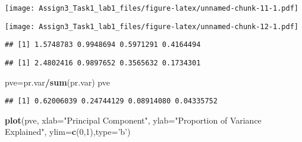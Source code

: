 \documentclass[]{article}
\newenvironment{Shaded}{\begin{snugshade}}{\end{snugshade}}
\newcommand{\DataTypeTok}[1]{\textcolor[rgb]{0.13,0.29,0.53}{#1}}
\newcommand{\DecValTok}[1]{\textcolor[rgb]{0.00,0.00,0.81}{#1}}
\newcommand{\KeywordTok}[1]{\textcolor[rgb]{0.13,0.29,0.53}{\textbf{#1}}}
\newcommand{\NormalTok}[1]{#1}
\newcommand{\OperatorTok}[1]{\textcolor[rgb]{0.81,0.36,0.00}{\textbf{#1}}}
\newcommand{\StringTok}[1]{\textcolor[rgb]{0.31,0.60,0.02}{#1}}
\begin{document}
\texttt{[image: Assign3\_Task1\_lab1\_files/figure-latex/unnamed-chunk-11-1.pdf]}

\begin{Shaded}
\end{Shaded}

\texttt{[image: Assign3\_Task1\_lab1\_files/figure-latex/unnamed-chunk-12-1.pdf]}

\begin{Shaded}
\end{Shaded}

\begin{verbatim}
## [1] 1.5748783 0.9948694 0.5971291 0.4164494
\end{verbatim}

\begin{Shaded}
\end{Shaded}

\begin{verbatim}
## [1] 2.4802416 0.9897652 0.3565632 0.1734301
\end{verbatim}

\begin{Shaded}
\begin{Highlighting}[]
\NormalTok{pve=pr.var}\OperatorTok{/}\KeywordTok{sum}\NormalTok{(pr.var)}
\NormalTok{pve}
\end{Highlighting}
\end{Shaded}

\begin{verbatim}
## [1] 0.62006039 0.24744129 0.08914080 0.04335752
\end{verbatim}

\begin{Shaded}
\begin{Highlighting}[]
\KeywordTok{plot}\NormalTok{(pve, }\DataTypeTok{xlab=}\StringTok{"Principal Component"}\NormalTok{, }\DataTypeTok{ylab=}\StringTok{"Proportion of Variance Explained"}\NormalTok{, }\DataTypeTok{ylim=}\KeywordTok{c}\NormalTok{(}\DecValTok{0}\NormalTok{,}\DecValTok{1}\NormalTok{),}\DataTypeTok{type=}\StringTok{'b'}\NormalTok{)}
\end{Highlighting}
\end{Shaded}
\end{document}
